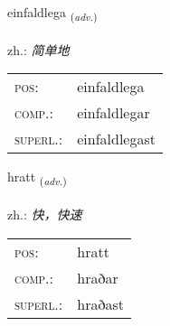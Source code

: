 \documentclass[frontgrid, backgrid]{flacards}\usepackage[]{graphicx}\usepackage[]{xcolor}
\begin{document}
\renewcommand{\flhead}{\vskip5pt \fboxsep=0pt {\small\bfseries\footnotesize Atviksorð | 副词}}
\renewcommand{\fcfoot}{\vskip5pt \fboxsep=0pt \hspace{2pt}{\small\bfseries\footnotesize 1K}}

\renewcommand{\blhead}{\vskip5pt {\small\bfseries\footnotesize Atviksorð | 副词 }}
\renewcommand{\bcfoot}{\vskip5pt \hspace{2pt}{\small\bfseries\footnotesize 1K}}


{einfaldlega \small{\textsubscript{(\textit{adv.})}} \\[1ex] %
\textphonetic{[einfaltlɛɣa]} \\
zh.: \emph{简单地} \\  [2ex]
\renewcommand*{\arraystretch}{0.8}
\begin{tabular}{ll}
\textsc{pos}: & einfaldlega \\ 
\textsc{comp.}: & einfaldlegar \\ 
\textsc{superl.}: & einfaldlegast \\
\end{tabular}
}

\renewcommand{\flhead}{\vskip5pt \fboxsep=0pt {\small\bfseries\footnotesize Atviksorð | 副词}}
\renewcommand{\fcfoot}{\vskip5pt \fboxsep=0pt \hspace{2pt}{\small\bfseries\footnotesize 1K}}

\renewcommand{\blhead}{\vskip5pt {\small\bfseries\footnotesize Atviksorð | 副词 }}
\renewcommand{\bcfoot}{\vskip5pt \hspace{2pt}{\small\bfseries\footnotesize 1K}}


{hratt \small{\textsubscript{(\textit{adv.})}} \\[1ex] %
\textphonetic{[r̥aht]} \\
zh.: \emph{快，快速} \\  [2ex]
\renewcommand*{\arraystretch}{0.8}
\begin{tabular}{ll}
\textsc{pos}: & hratt \\ 
\textsc{comp.}: & hraðar \\ 
\textsc{superl.}: & hraðast \\
\end{tabular}
}
\end{document}
